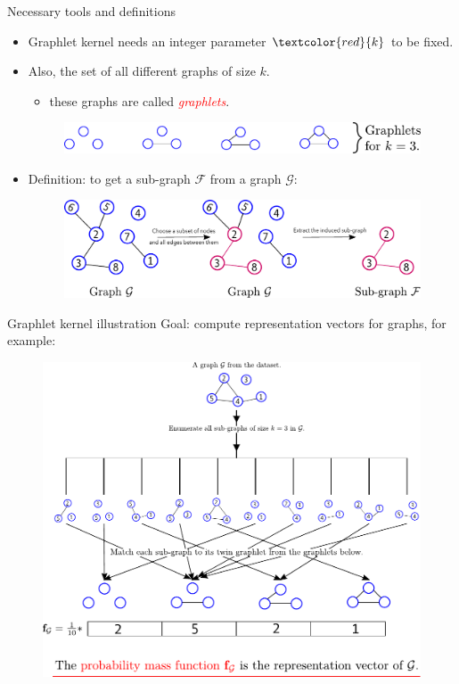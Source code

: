 \documentclass{beamer}
\begin{document}
\begin{frame}{Necessary tools and definitions}
    \begin{itemize}
    \footnotesize
    \item Graphlet kernel needs an integer parameter $\textcolor{red}{k}$ to be fixed.
    \vfill
      \item Also, the set of all different graphs of size $k$.
          \begin{itemize}
      	\item these graphs are called \textcolor{red}{{\emph{graphlets}}}.
      \end{itemize}
    	\begin{figure}[H]
  	\centering
  	\includegraphics[scale=0.45]{figs/graphlets.pdf}
  	\vfill
  \end{figure}  
	\vfill
  \item Definition: to get a sub-graph $\mathcal{F}$ from a graph $\mathcal{G}$:
  	\begin{figure}[H]
  	\centering
  	\includegraphics[scale=0.5]{figs/subgraphs.pdf}
  	\vfill
  \end{figure}  

    \end{itemize}
\end{frame}

\begin{frame}{Graphlet kernel illustration}
	\footnotesize
	Goal: compute representation vectors for graphs, for example:
	\begin{figure}[H]
		\centering
		\includegraphics[scale=0.5]{figs/gk.pdf}
		\vfill
	\end{figure}
\end{frame}
\end{document}
